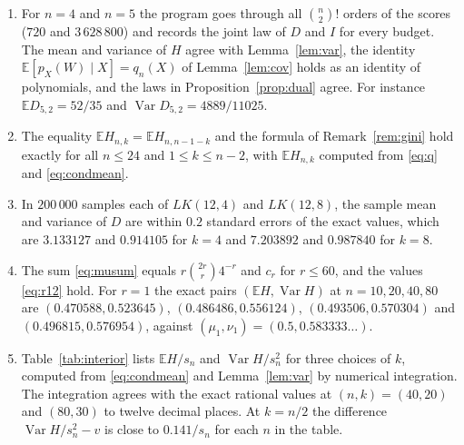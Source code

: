 \documentclass[11pt]{amsart}
\theoremstyle{remark}
\numberwithin{equation}{section}
\newcommand{\E}{\mathbb E}
\newcommand{\1}{\mathbf 1}
\newcommand{\Var}{\operatorname{Var}}
\begin{document}
\begin{enumerate}[label=(\alph*),leftmargin=*]
\item For $n=4$ and $n=5$ the program goes through all $\binom n2!$ orders of the scores ($720$ and $3\,628\,800$) and records the joint law of $D$ and $I$ for every budget. The mean and variance of $H$ agree with Lemma~\ref{lem:var}, the identity $\E[p_X(W)\mid X]=q_n(X)$ of Lemma~\ref{lem:cov} holds as an identity of polynomials, and the laws in Proposition~\ref{prop:dual} agree. For instance $\E D_{5,2}=52/35$ and $\Var D_{5,2}=4889/11025$.
\item The equality $\E H_{n,k}=\E H_{n,n-1-k}$ and the formula of Remark~\ref{rem:gini} hold exactly for all $n\le24$ and $1\le k\le n-2$, with $\E H_{n,k}$ computed from \eqref{eq:q} and \eqref{eq:condmean}.
\item In $200\,000$ samples each of $LK(12,4)$ and $LK(12,8)$, the sample mean and variance of $D$ are within $0.2$ standard errors of the exact values, which are $3.133127$ and $0.914105$ for $k=4$ and $7.203892$ and $0.987840$ for $k=8$.
\item The sum \eqref{eq:musum} equals $r\binom{2r}r4^{-r}$ and $c_r$ for $r\le60$, and the values \eqref{eq:r12} hold. For $r=1$ the exact pairs $(\E H,\Var H)$ at $n=10,20,40,80$ are $(0.470588,0.523645)$, $(0.486486,0.556124)$, $(0.493506,0.570304)$ and $(0.496815,0.576954)$, against $(\mu_1,\nu_1)=(0.5,0.583333\ldots)$.
\item Table~\ref{tab:interior} lists $\E H/s_n$ and $\Var H/s_n^2$ for three choices of $k$, computed from \eqref{eq:condmean} and Lemma~\ref{lem:var} by numerical integration. The integration agrees with the exact rational values at $(n,k)=(40,20)$ and $(80,30)$ to twelve decimal places. At $k=n/2$ the difference $\Var H/s_n^2-v$ is close to $0.141/s_n$ for each $n$ in the table.
\end{enumerate}
\end{document}
